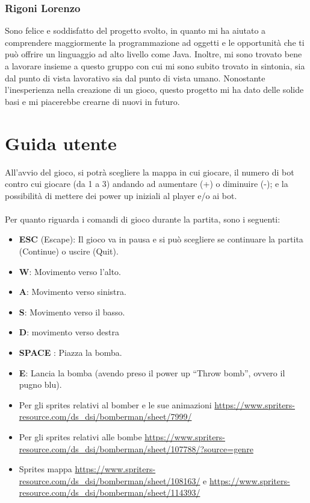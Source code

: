 \documentclass[a4paper,12pt]{report}
\begin{document}
\subsection*{Rigoni Lorenzo}
Sono felice e soddisfatto del progetto svolto, in quanto mi ha aiutato a comprendere maggiormente la programmazione ad oggetti e le opportunità che ti può offrire un linguaggio ad alto livello come Java. Inoltre, mi sono trovato bene a lavorare insieme a questo gruppo con cui mi sono subito trovato in sintonia, sia dal punto di vista lavorativo sia dal punto di vista umano. Nonostante l’inesperienza nella creazione di un gioco, questo progetto mi ha dato delle solide basi e mi piacerebbe crearne di nuovi in futuro.

\appendix
\chapter{Guida utente}

All’avvio del gioco, si potrà scegliere la mappa in cui giocare, il numero di bot contro cui giocare (da 1 a 3) andando ad aumentare (+) o diminuire (-);  e la possibilità di mettere dei power up iniziali al player e/o ai bot.
\\
\\
Per quanto riguarda i comandi di gioco durante la partita, sono i seguenti:
\begin{itemize}
    \item \textbf{ESC} (Escape): Il gioco va in pausa e si può scegliere se continuare la partita (Continue) o uscire (Quit).
    \item \textbf{W}: Movimento verso l'alto.
    \item \textbf{A}: Movimento verso sinistra.
    \item \textbf{S}: Movimento verso il basso.
    \item \textbf{D}: movimento verso destra
    \item \textbf{SPACE} : Piazza la bomba.
    \item \textbf{E}: Lancia la bomba (avendo preso il power up “Throw bomb”, ovvero il pugno blu).
\end{itemize}



\begin{itemize}
    \item Per gli sprites relativi al bomber e le sue animazioni  \url{https://www.spriters-resource.com/ds_dsi/bomberman/sheet/7999/}
    \item Per gli sprites relativi alle bombe \url{https://www.spriters-resource.com/ds_dsi/bomberman/sheet/107788/?source=genre}
    \item Sprites mappa \url{https://www.spriters-resource.com/ds_dsi/bomberman/sheet/108163/} e \url{https://www.spriters-resource.com/ds_dsi/bomberman/sheet/114393/}
\end{itemize}
\end{document}
